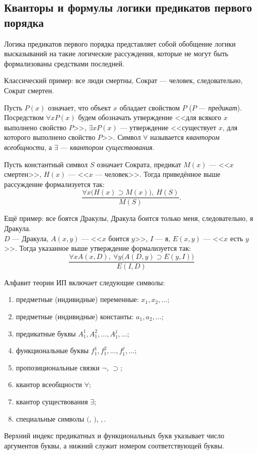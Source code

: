 \subsection{Кванторы и формулы логики предикатов первого порядка}\label{par:first_order_logic}
Логика предикатов первого порядка представляет собой обобщение логики высказываний на такие логические рассуждения, которые не могут быть формализованы средствами последней.

Классический пример: все люди смертны, Сократ --- человек, следовательно, Сократ смертен.

Пусть $P(x)$ означает, что объект $x$ обладает свойством $P$ ($P$ --- \textit{предикат}). Посредством $\forall xP(x)$ будем обозначать утверждение <<для всякого $x$ выполнено свойство $P$>>, $\exists xP(x)$ --- утверждение <<существует $x$, для которого выполнено свойство $P$>>. Символ $\forall$ называется \textit{квантором всеобщности}, а $\exists$ --- \textit{квантором существования}.

Пусть константный символ $S$ означает Сократа, предикат $M(x)$ --- <<$x$ смертен>>, $H(x)$ --- <<$x$ --- человек>>. Тогда приведённое выше рассуждение формализуется так:
\[
    \frac{\forall x\big(H(x) \supset M(x)\big),\ H(S)}{M(S)}.
\]

Ещё пример: все боятся Дракулы, Дракула боится только меня, следовательно, я Дракула. \\
$D$ --- Дракула, $A(x, y)$ --- <<$x$ боится $y$>>, $I$ --- я, $E(x, y)$ --- <<$x$ есть $y$>>. Тогда указанное выше утверждение формализуется так:
\[
    \frac{\forall xA(x, D),\ \forall y\big(A(D, y) \supset E(y, I)\big)}{E(I, D)}
\]

Алфавит теории ИП включает следующие символы:
\begin{enumerate}
    \item предметные (индивидные) переменные: $x_1, x_2, \dots$;
    \item предметные (индивидные) константы: $a_1, a_2, \dots$;
    \item предикатные буквы $A_1^1, A_1^2, \dots, A_1^j, \dots$;
    \item функциональные буквы $f_1^1, f_1^2, \dots, f_1^j, \dots$;
    \item пропозициональные связки $\neg$, $\supset$;
    \item квантор всеобщности $\forall$;
    \item квантор существования $\exists$;
    \item специальные символы $($, $)$, $,$.
\end{enumerate}
Верхний индекс предикатных и функциональных букв указывает число аргументов буквы, а нижний служит номером соответствующей буквы.

